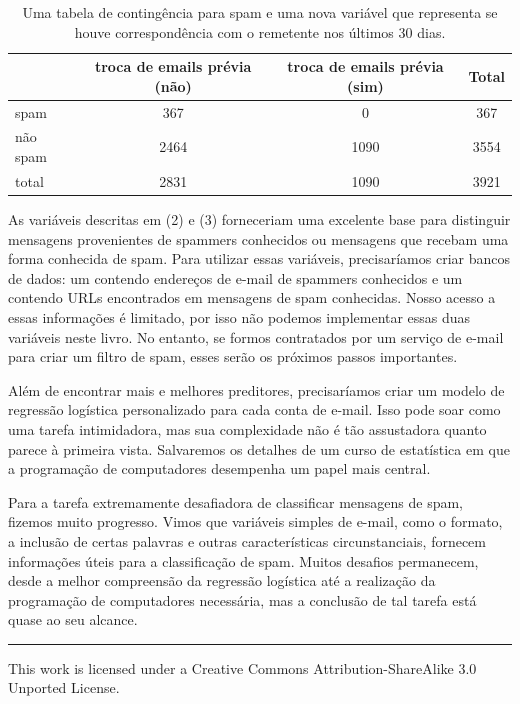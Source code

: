 \documentclass[
]{book}
\theoremstyle{definition}
\theoremstyle{definition}
\theoremstyle{definition}
\theoremstyle{definition}
\theoremstyle{remark}
\begin{document}
\begin{table}

\caption{\label{tab:emailTableOfSpamAnd}Uma tabela de contingência para spam e uma nova variável que representa se houve correspondência com o remetente nos últimos 30 dias.}
\centering
\begin{tabular}[t]{l|c|c|c}
\hline
  & troca de emails prévia (não) & troca de emails prévia (sim) & Total\\
\hline
spam & 367 & 0 & 367\\
\hline
não spam & 2464 & 1090 & 3554\\
\hline
total & 2831 & 1090 & 3921\\
\hline
\end{tabular}
\end{table}

As variáveis descritas em (2) e (3) forneceriam uma excelente base para distinguir mensagens provenientes de spammers conhecidos ou mensagens que recebam uma forma conhecida de spam. Para utilizar essas variáveis, precisaríamos criar bancos de dados: um contendo endereços de e-mail de spammers conhecidos e um contendo URLs encontrados em mensagens de spam conhecidas. Nosso acesso a essas informações é limitado, por isso não podemos implementar essas duas variáveis neste livro. No entanto, se formos contratados por um serviço de e-mail para criar um filtro de spam, esses serão os próximos passos importantes.

Além de encontrar mais e melhores preditores, precisaríamos criar um modelo de regressão logística personalizado para cada conta de e-mail. Isso pode soar como uma tarefa intimidadora, mas sua complexidade não é tão assustadora quanto parece à primeira vista. Salvaremos os detalhes de um curso de estatística em que a programação de computadores desempenha um papel mais central.

Para a tarefa extremamente desafiadora de classificar mensagens de spam, fizemos muito progresso. Vimos que variáveis simples de e-mail, como o formato, a inclusão de certas palavras e outras características circunstanciais, fornecem informações úteis para a classificação de spam. Muitos desafios permanecem, desde a melhor compreensão da regressão logística até a realização da programação de computadores necessária, mas a conclusão de tal tarefa está quase ao seu alcance.

\begin{center}\rule{0.5\linewidth}{0.5pt}\end{center}

This work is licensed under a Creative Commons Attribution-ShareAlike 3.0 Unported License.
\end{document}
